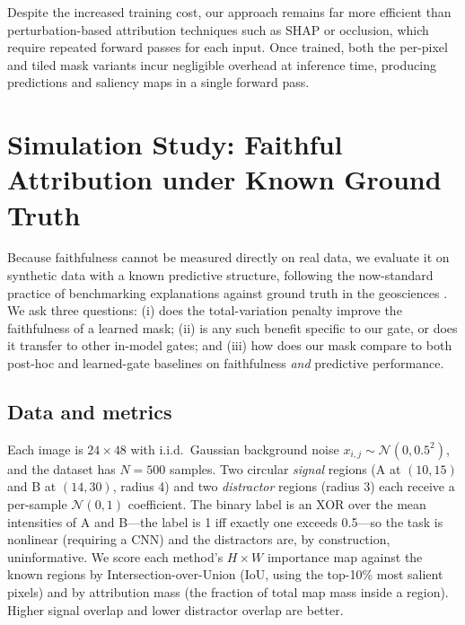 \documentclass[12pt]{article}
\begin{document}
Despite the increased training cost, our approach remains far more efficient than perturbation-based attribution techniques such as SHAP or occlusion, which require repeated forward passes for each input. Once trained, both the per-pixel and tiled mask variants incur negligible overhead at inference time, producing predictions and saliency maps in a single forward pass.


\section{Simulation Study: Faithful Attribution under Known Ground Truth}\label{sec:sim}

Because faithfulness cannot be measured directly on real data, we evaluate it on synthetic
data with a known predictive structure, following the now-standard practice of benchmarking
explanations against ground truth in the geosciences \citep{Mamalakis2022Fidelity}. We ask three
questions: (i) does the total-variation penalty improve the faithfulness of a learned mask;
(ii) is any such benefit specific to our gate, or does it transfer to other in-model gates; and
(iii) how does our mask compare to both post-hoc and learned-gate baselines on faithfulness
\emph{and} predictive performance.

\subsection{Data and metrics}
Each image is $24\times48$ with i.i.d.\ Gaussian background noise
$x_{i,j}\sim\mathcal N(0,0.5^2)$, and the dataset has $N=500$ samples. Two circular
\emph{signal} regions (A at $(10,15)$ and B at $(14,30)$, radius 4) and two \emph{distractor}
regions (radius 3) each receive a per-sample $\mathcal N(0,1)$ coefficient. The binary label is
an XOR over the mean intensities of A and B---the label is 1 iff exactly one exceeds 0.5---so
the task is nonlinear (requiring a CNN) and the distractors are, by construction, uninformative.
We score each method's $H\times W$ importance map against the known regions by
Intersection-over-Union (IoU, using the top-10\% most salient pixels) and by attribution mass
(the fraction of total map mass inside a region). Higher signal overlap and lower distractor
overlap are better.
\end{document}
